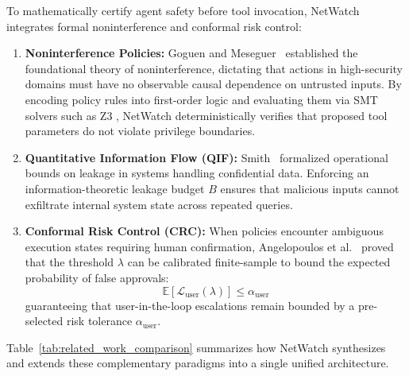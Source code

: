 To mathematically certify agent safety before tool invocation, NetWatch integrates formal noninterference and conformal risk control:
\begin{enumerate}
    \item \textbf{Noninterference Policies:} Goguen and Meseguer~\cite{goguen1982} established the foundational theory of noninterference, dictating that actions in high-security domains must have no observable causal dependence on untrusted inputs. By encoding policy rules into first-order logic and evaluating them via SMT solvers such as Z3 \cite{demoura2008z3}, NetWatch deterministically verifies that proposed tool parameters do not violate privilege boundaries.
    \item \textbf{Quantitative Information Flow (QIF):} Smith~\cite{smith2009qif} formalized operational bounds on leakage in systems handling confidential data. Enforcing an information-theoretic leakage budget $B$ ensures that malicious inputs cannot exfiltrate internal system state across repeated queries.
    \item \textbf{Conformal Risk Control (CRC):} When policies encounter ambiguous execution states requiring human confirmation, Angelopoulos et al.~\cite{angelopoulos2024crc} proved that the threshold $\lambda$ can be calibrated finite-sample to bound the expected probability of false approvals:
    \begin{equation}
        \mathbb{E}\left[\mathcal{L}_{\mathrm{user}}(\lambda)\right] \le \alpha_{\mathrm{user}}
    \end{equation}
    guaranteeing that user-in-the-loop escalations remain bounded by a pre-selected risk tolerance $\alpha_{\mathrm{user}}$.
\end{enumerate}

Table~\ref{tab:related_work_comparison} summarizes how NetWatch synthesizes and extends these complementary paradigms into a single unified architecture.

